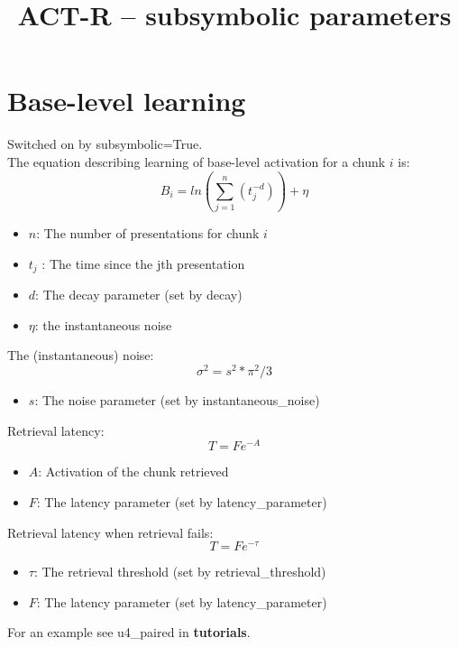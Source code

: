 \documentclass{article}
\title{ACT-R -- subsymbolic parameters}
\date{}
\begin{document}
\maketitle
\section*{Base-level learning}
\noindent Switched on by subsymbolic=True.\\
The equation describing learning of base-level activation for a chunk $i$ is:
$$B_i = ln(\sum_{j=1}^{n}(t_j^{-d}))+ \eta$$
\begin{itemize}
\item $n$: The number of presentations for chunk $i$
\item $t_j$ : The time since the jth presentation
\item $d$: The decay parameter (set by decay)
\item $\eta$: the instantaneous noise
\end{itemize}
The (instantaneous) noise:
$$\sigma^2=s^2*\pi^2/3$$
\begin{itemize}
    \item $s$: The noise parameter (set by instantaneous\_noise)
\end{itemize}
Retrieval latency:
$$T=Fe^{-A}$$
\begin{itemize}
    \item $A$: Activation of the chunk retrieved
    \item $F$: The latency parameter (set by latency\_parameter)
\end{itemize}
Retrieval latency when retrieval fails:
$$T=Fe^{-\tau}$$
\begin{itemize}
    \item $\tau$: The retrieval threshold (set by retrieval\_threshold)
    \item $F$: The latency parameter (set by latency\_parameter)
\end{itemize}
For an example see u4\_paired in \textbf{tutorials}.
\end{document}
